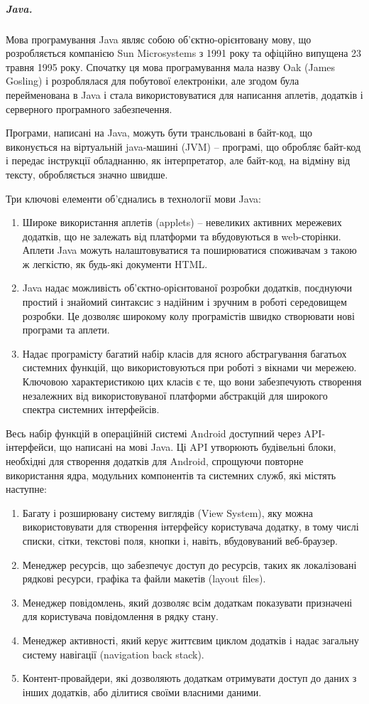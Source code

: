 \documentclass[../main.tex]{subfiles}
\begin{document}
\subparagraph{Java.}
Мова програмування Java являє собою об'єктно-орієнтовану мову, що розробляється компанією Sun Microsystems з 1991 року та офіційно випущена 23 травня 1995 року. Спочатку ця мова програмування  мала назву Oak (James Gosling) і розроблялася для побутової електроніки, але згодом була перейменована в Java і стала використовуватися для написання аплетів, додатків і серверного програмного забезпечення.

Програми, написані на Java, можуть бути трансльовані в байт-код, що виконується на віртуальній java-машині (JVM) -- програмі, що обробляє байт-код і передає інструкції обладнанню, як інтерпретатор, але байт-код, на відміну від тексту, обробляється значно швидше.

Три ключові елементи об'єднались в технології мови Java:
\begin{enumerate}
	\item Широке використання аплетів (applets) -- невеликих активних мережевих додатків, що не залежать від платформи та вбудовуються в web-сторінки. Аплети Java можуть налаштовуватися та поширюватися споживачам з такою ж легкістю, як будь-які документи HTML.
	\item Java надає можливість об'єктно-орієнтованої розробки додатків, поєднуючи простий і знайомий синтаксис з надійним і зручним в роботі середовищем розробки. Це дозволяє широкому колу програмістів швидко створювати нові програми та аплети.
	\item Надає програмісту багатий набір класів для ясного абстрагування багатьох системних функцій, що використовуються при роботі з вікнами чи мережею. Ключовою характеристикою цих класів є те, що вони забезпечують створення незалежних від використовуваної платформи абстракцій для широкого спектра системних інтерфейсів.
\end{enumerate}

Весь набір функцій в операційній системі Android доступний через API-інтерфейси, що написані на мові Java. Ці API утворюють будівельні блоки, необхідні для створення додатків для Android, спрощуючи повторне використання ядра, модульних компонентів та системних служб, які містять наступне:

\begin{enumerate}
	\item Багату і розширювану систему виглядів (View System), яку можна використовувати для створення інтерфейсу користувача додатку, в тому числі списки, сітки, текстові поля, кнопки і, навіть, вбудовуваний веб-браузер.
	\item Менеджер ресурсів, що забезпечує доступ до ресурсів, таких як локалізовані рядкові ресурси, графіка та файли макетів (layout files).
	\item Менеджер повідомлень, який дозволяє всім додаткам показувати призначені для користувача повідомлення в рядку стану.
	\item Менеджер активності, який керує життєвим циклом додатків і надає загальну систему навігації (navigation back stack).
	\item Контент-провайдери, які дозволяють додаткам отримувати доступ до даних з інших додатків, або ділитися своїми власними даними.
\end{enumerate}
\end{document}

